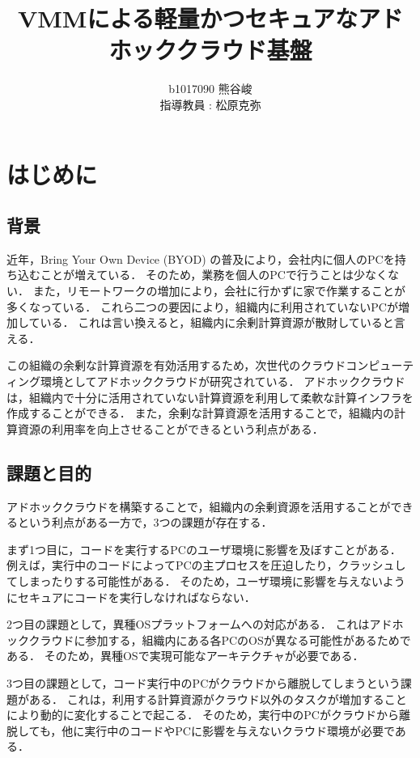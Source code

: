 \documentclass[11pt]{ujarticle} %
\author{%
b1017090 熊谷峻\\指導教員 : 松原克弥
}
\title{VMMによる軽量かつセキュアなアドホッククラウド基盤}
\begin{document}
\maketitle

\section{はじめに}
\subsection{背景}
近年，Bring Your Own Device (BYOD) の普及により，会社内に個人のPCを持ち込むことが増えている． そのため，業務を個人のPCで行うことは少なくない． また，リモートワークの増加により，会社に行かずに家で作業することが多くなっている． これら二つの要因により，組織内に利用されていないPCが増加している． これは言い換えると，組織内に余剰計算資源が散財していると言える．

この組織の余剰な計算資源を有効活用するため，次世代のクラウドコンピューティング環境としてアドホッククラウドが研究されている\cite{adhoc}． アドホッククラウドは，組織内で十分に活用されていない計算資源を利用して柔軟な計算インフラを作成することができる． また，余剰な計算資源を活用することで，組織内の計算資源の利用率を向上させることができるという利点がある．

\subsection{課題と目的}
アドホッククラウドを構築することで，組織内の余剰資源を活用することができるという利点がある一方で，3つの課題が存在する．

まず1つ目に，コードを実行するPCのユーザ環境に影響を及ぼすことがある． 例えば，実行中のコードによってPCの主プロセスを圧迫したり，クラッシュしてしまったりする可能性がある． そのため，ユーザ環境に影響を与えないようにセキュアにコードを実行しなければならない．

2つ目の課題として，異種OSプラットフォームへの対応がある． これはアドホッククラウドに参加する，組織内にある各PCのOSが異なる可能性があるためである． そのため，異種OSで実現可能なアーキテクチャが必要である．

3つ目の課題として，コード実行中のPCがクラウドから離脱してしまうという課題がある． これは，利用する計算資源がクラウド以外のタスクが増加することにより動的に変化することで起こる． そのため，実行中のPCがクラウドから離脱しても，他に実行中のコードやPCに影響を与えないクラウド環境が必要である．
\end{document}
